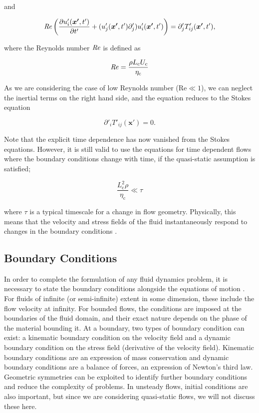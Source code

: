 \documentclass[12pt]{article}
\newcommand\Rey{\mbox{\textit{Re}}}  %
\begin{document}
and

\begin{equation}
\label{equ:NS_low_Reynolds}
\Rey \left(\frac{\partial u'_{i}(\boldsymbol{x'},t')}{\partial t'} + (u'_{j}(\boldsymbol{x'},t') \partial'_{j}) u'_{i}(\boldsymbol{x'},t') \right) = \partial'_{j} T'_{ij}(\boldsymbol{x'},t') ,
\end{equation}

where the Reynolds number $\Rey$ is defined as

\begin{equation}
\label{equ:Reynolds}
\Rey = \frac{\rho L_{\text{c}} U_{\text{c}}}{\eta_{\text{c}}}
\end{equation}

As we are considering the case of low Reynolds number ($\text{Re} \ll 1$), we can neglect the inertial terms on the right hand side, and the equation reduces to the Stokes equation \citep{Batchelor67, Kim05}

\begin{equation}
\label{equ:Stokes}
\partial'_{i} T'_{ij}(\boldsymbol{x'}) = 0 .
\end{equation}

Note that the explicit time dependence has now vanished from the Stokes equations. However, it is still valid to use the equations for time dependent flows where the boundary conditions change with time, if the quasi-static assumption is satisfied;

\begin{equation}
\label{equ:quasi_stat}
\frac{L_{\text{c}}^{2} \rho}{\eta_{\text{c}}} \ll \tau
\end{equation}

where $\tau$ is a typical timescale for a change in flow geometry. Physically, this means that the velocity and stress fields of the fluid instantaneously respond to changes in the boundary conditions \citep{Manga94}.

\subsection{Boundary Conditions}
\label{subsec:BC}

In order to complete the formulation of any fluid dynamics problem, it is necessary to state the boundary conditions alongside the equations of motion \citep{Riley06}. For fluids of infinite (or semi-infinite) extent in some dimension, these include the flow velocity at infinity. For bounded flows, the conditions are imposed at the boundaries of the fluid domain, and their exact nature depends on the phase of the material bounding it. At a boundary, two types of boundary condition can exist: a kinematic boundary condition on the velocity field and a dynamic boundary condition on the stress field (derivative of the velocity field). Kinematic boundary conditions are an expression of mass conservation and dynamic boundary conditions are a balance of forces, an expression of Newton's third law. Geometric symmetries can be exploited to identify further boundary conditions and reduce the complexity of problems. In unsteady flows, initial conditions are also important, but since we are considering quasi-static flows, we will not discuss these here.
\end{document}

